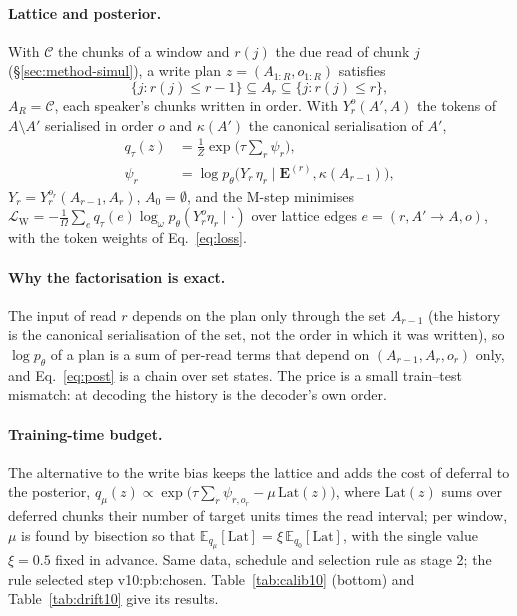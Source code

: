 \paragraph{Lattice and posterior.} With $\mathcal{C}$ the chunks of a window and $r(j)$ the due read of chunk $j$
(\S\ref{sec:method-simul}), a write plan $z=(A_{1:R},o_{1:R})$ satisfies
\begin{equation}
\{j:r(j)\le r-1\}\subseteq A_r\subseteq\{j:r(j)\le r\},
\label{eq:lattice}
\end{equation}
$A_R=\mathcal{C}$, each speaker's chunks written in order. With $Y_r^{o}(A',A)$ the tokens of $A\setminus A'$ serialised in order $o$ and
$\kappa(A')$ the canonical serialisation of $A'$,
\begin{equation}
\begin{aligned}
q_\tau(z)&=\tfrac{1}{Z}\exp\Big(\tau\textstyle\sum_{r}\psi_r\Big),\\
\psi_r&=\log p_\theta\big(Y_r\,\eta_r\mid\bm{E}^{(r)},\kappa(A_{r-1})\big),
\end{aligned}
\label{eq:post}
\end{equation}
$Y_r=Y_r^{o_r}(A_{r-1},A_r)$, $A_0=\emptyset$, and the M-step minimises $\mathcal{L}_\mathrm{W}=-\frac{1}{\Omega}\sum_e q_\tau(e)\log_\omega
p_\theta(Y_r^{o}\eta_r\mid\cdot)$ over lattice edges $e=(r,A'\!\to\!A,o)$, with the token weights of
Eq.~\eqref{eq:loss}.

\paragraph{Why the factorisation is exact.} The input of read $r$ depends on the plan only through the set $A_{r-1}$
(the history is the canonical serialisation of the set, not the order in which it was written), so
$\log p_\theta$ of a plan is a sum of per-read terms that depend on $(A_{r-1},A_r,o_r)$ only, and Eq.~\eqref{eq:post} is a
chain over set states. The price is a small train--test mismatch: at decoding the history is the decoder's own order.

\paragraph{Training-time budget.} The alternative to the write bias keeps the lattice and adds the cost of
deferral to the posterior, $q_\mu(z)\propto\exp\big(\tau\sum_r\psi_{r,o_r}-\mu\,\mathrm{Lat}(z)\big)$, where
$\mathrm{Lat}(z)$ sums over deferred chunks their number of target units times the read interval; per window, $\mu$ is
found by bisection so that $\mathbb{E}_{q_\mu}[\mathrm{Lat}]=\xi\,\mathbb{E}_{q_0}[\mathrm{Lat}]$, with the single value
$\xi=0.5$ fixed in advance. Same data, schedule and selection rule as stage 2; the rule selected step
\num{v10:pb:chosen}. Table~\ref{tab:calib10} (bottom) and Table~\ref{tab:drift10} give its results.

